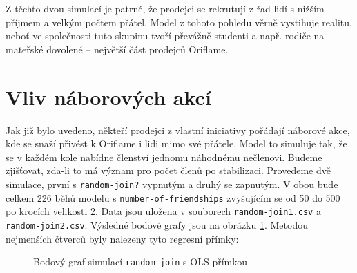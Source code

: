 \documentclass[a4wide,12pt]{report}
\begin{document}
Z těchto dvou simulací je patrné, že prodejci se rekrutují z řad lidí s nižším příjmem a velkým počtem přátel. Model z tohoto pohledu věrně vystihuje realitu, neboť ve společnosti tuto skupinu tvoří převážně studenti a např. rodiče na mateřské dovolené -- největší část prodejců Oriflame.
\section{Vliv náborových akcí}
Jak již bylo uvedeno, někteří prodejci z vlastní iniciativy pořádají náborové akce, kde se snaží přivést k Oriflame i lidi mimo své přátele. Model to simuluje tak, že se v každém kole nabídne členství jednomu náhodnému nečlenovi. Budeme zjišťovat, zda-li to má význam pro počet členů po stabilizaci. Provedeme dvě simulace, první s \texttt{random-join?} vypnutým a druhý se zapnutým. V obou bude celkem 226 běhů modelu s \texttt{number-of-friendships} zvyšujícím se od 50 do 500 po krocích velikosti 2. Data jsou uložena v souborech \texttt{random-join1.csv} a \texttt{random-join2.csv}. Výsledné bodové grafy jsou na obrázku \ref{fig:random-join}. Metodou nejmenších čtverců byly nalezeny tyto regresní přímky:
\begin{figure}[h]
  \centering
  \caption{Bodový graf simulací \texttt{random-join} s OLS přímkou}
  \label{fig:random-join}
\end{figure}
\end{document}
